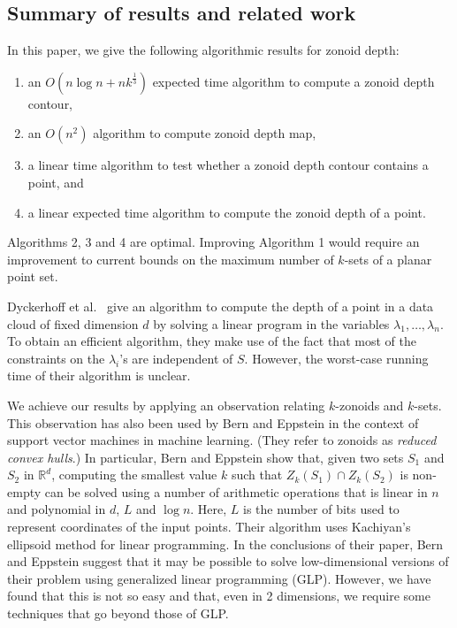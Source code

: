 \documentclass[charterfonts,lotsofwhite]{patmorin}
\begin{document}
\subsection{Summary of results and related work}
\label{subsection_summary_of_results}

In this paper, we give the following algorithmic results for zonoid
depth:

\begin{enumerate}

\item an $O(n \log n + nk^{\frac{1}{3}})$ expected time algorithm to
compute a zonoid depth contour,

\item an $O(n^2)$ algorithm to compute zonoid depth map,

\item a linear time algorithm to test whether a zonoid depth contour
contains a point, and 

\item a linear expected time algorithm to compute the zonoid depth of
     a point.

\end{enumerate}

Algorithms 2, 3 and 4 are optimal. Improving Algorithm 1 would require an
improvement to current bounds on the maximum number of $k$-sets
of a planar point set.

Dyckerhoff et al.\ \cite{zonoid_data_depth_theory_and_computation}
give an algorithm to compute the depth of a point in a data cloud of
fixed dimension $d$ by solving a linear program in the variables
$\lambda_1,\ldots, \lambda_n$. To obtain an efficient algorithm, they
make use of the fact that most of the constraints on the $\lambda_i$'s
are independent of $S$. However, the worst-case running time of their
algorithm is unclear. 

We achieve our results by applying an observation relating $k$-zonoids
and $k$-sets.  This observation has also been used by Bern and
Eppstein \cite{bern-eppstein-01} in the context of support vector
machines in machine learning.  (They refer to zonoids as \emph{reduced
convex hulls}.) In particular, Bern and Eppstein show that, given two
sets $S_1$ and $S_2$ in $\mathbb{R}^d$, computing the smallest value
$k$ such that $Z_k(S_1)\cap Z_k(S_2)$ is non-empty can be solved using
a number of arithmetic operations that is linear in $n$ and polynomial
in $d$, $L$ and $\log n$.  Here, $L$ is the number of bits used to
represent coordinates of the input points.  Their algorithm uses
Kachiyan's ellipsoid method \cite{k79} for linear programming.  In the
conclusions of their paper, Bern and Eppstein suggest that it may be
possible to solve low-dimensional versions of their problem using
generalized linear programming (GLP).  However, we have found that
this is not so easy and that, even in 2 dimensions, we require some
techniques that go beyond those of GLP.
\end{document}
